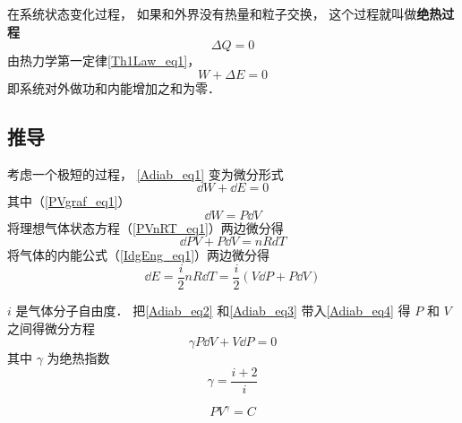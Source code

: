 

在系统状态变化过程， 如果和外界没有热量和粒子交换， 这个过程就叫做\textbf{绝热过程}
\begin{equation}
\Delta Q = 0
\end{equation}
由热力学第一定律\autoref{Th1Law_eq1}，
\begin{equation}\label{Adiab_eq1}
W + \Delta E = 0
\end{equation}
即系统对外做功和内能增加之和为零．

\subsection{推导}
考虑一个极短的过程， \autoref{Adiab_eq1} 变为微分形式
\begin{equation}\label{Adiab_eq4}
\dd{W} + \dd{E} = 0
\end{equation}
其中（\autoref{PVgraf_eq1}）
\begin{equation}\label{Adiab_eq2}
\dd{W} = P\dd{V}
\end{equation}
将理想气体状态方程（\autoref{PVnRT_eq1}）两边微分得
\begin{equation}
\dd{P}V + P\dd{V} = nRdT
\end{equation}
将气体的内能公式（\autoref{IdgEng_eq1}）两边微分得
\begin{equation}\label{Adiab_eq3}
\dd{E} = \frac{i}{2}n R\dd{T} = \frac{i}{2} (V\dd{P} + P\dd{V})
\end{equation}


$i$ 是气体分子自由度． 把\autoref{Adiab_eq2} 和\autoref{Adiab_eq3} 带入\autoref{Adiab_eq4} 得 $P$ 和 $V$ 之间得微分方程
\begin{equation}
\gamma P\dd{V} + V \dd{P} = 0
\end{equation}
其中 $\gamma$ 为绝热指数
\begin{equation}
\gamma = \frac{i+2}{i}
\end{equation}

\begin{equation}
P V^\gamma = C
\end{equation}
